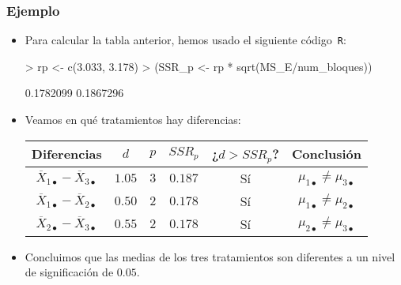 \begin{frame}[fragile]
\frametitle{Ejemplo}
\begin{itemize}
\item<2-> Para calcular la tabla anterior, hemos usado el siguiente código~{\tt R}:

\begin{Schunk}
\begin{Sinput}
> rp <- c(3.033, 3.178)
> (SSR_p <- rp * sqrt(MS_E/num_bloques))
\end{Sinput}
\begin{Soutput}
[1] 0.1782099 0.1867296
\end{Soutput}
\end{Schunk}

\item<3-> Veamos en qué tratamientos hay diferencias:
{\small
\begin{center}
\begin{tabular}{|c|c|c|c|c|c|}
\hline
Diferencias&$d$&$p$&$SSR_p$&¿$d>SSR_p$?&Conclusión\\\hline
$\overline{X}_{1\bullet}-\overline{X}_{3\bullet}$&$1.05$&$3$&$0.187$&Sí&$\mu_{1\bullet}\not=\mu_{3\bullet}$\\\hline
$\overline{X}_{1\bullet}-\overline{X}_{2\bullet}$&$0.50$&$2$&$0.178$&Sí&$\mu_{1\bullet}\not=\mu_{2\bullet}$\\\hline
$\overline{X}_{2\bullet}-\overline{X}_{3\bullet}$&$0.55$&$2$&$0.178$&Sí&$\mu_{2\bullet}\not=\mu_{3\bullet}$\\\hline
\end{tabular}
\end{center}
}
\item<4-> Concluimos que las medias de los tres tratamientos son diferentes a un nivel de significación de $0.05$.
\end{itemize}
\end{frame}
